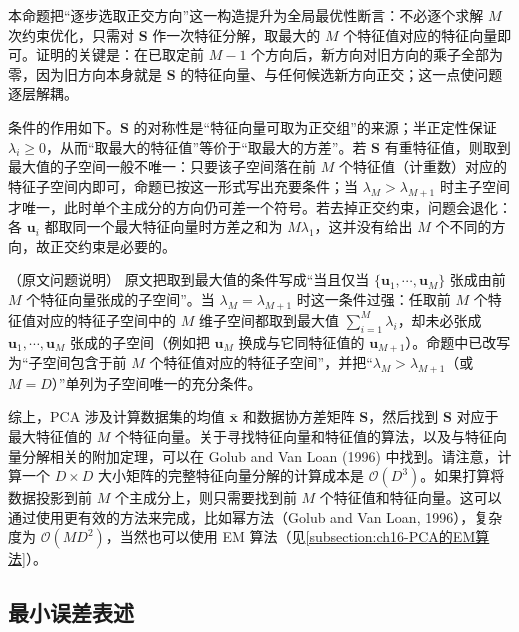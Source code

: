 \documentclass[../../main.tex]{subfiles}
\begin{document}
\begin{remark}
本命题把“逐步选取正交方向”这一构造提升为全局最优性断言：不必逐个求解 $M$ 次约束优化，只需对 $\bm{S}$ 作一次特征分解，取最大的 $M$ 个特征值对应的特征向量即可。证明的关键是：在已取定前 $M-1$ 个方向后，新方向对旧方向的乘子全部为零，因为旧方向本身就是 $\bm{S}$ 的特征向量、与任何候选新方向正交；这一点使问题逐层解耦。

条件的作用如下。$\bm{S}$ 的对称性是“特征向量可取为正交组”的来源；半正定性保证 $\lambda_i\geqslant0$，从而“取最大的特征值”等价于“取最大的方差”。若 $\bm{S}$ 有重特征值，则取到最大值的子空间一般不唯一：只要该子空间落在前 $M$ 个特征值（计重数）对应的特征子空间内即可，命题已按这一形式写出充要条件；当 $\lambda_M>\lambda_{M+1}$ 时主子空间才唯一，此时单个主成分的方向仍可差一个符号。若去掉正交约束，问题会退化：各 $\bm{u}_i$ 都取同一个最大特征向量时方差之和为 $M\lambda_1$，这并没有给出 $M$ 个不同的方向，故正交约束是必要的。
\end{remark}

\begin{remark}（原文问题说明）
原文把取到最大值的条件写成“当且仅当 $\{\bm{u}_1,\cdots,\bm{u}_M\}$ 张成由前 $M$ 个特征向量张成的子空间”。当 $\lambda_M=\lambda_{M+1}$ 时这一条件过强：任取前 $M$ 个特征值对应的特征子空间中的 $M$ 维子空间都取到最大值 $\sum_{i=1}^{M}\lambda_i$，却未必张成 $\bm{u}_1,\cdots,\bm{u}_M$ 张成的子空间（例如把 $\bm{u}_M$ 换成与它同特征值的 $\bm{u}_{M+1}$）。命题中已改写为“子空间包含于前 $M$ 个特征值对应的特征子空间”，并把“$\lambda_M>\lambda_{M+1}$（或 $M=D$）”单列为子空间唯一的充分条件。
\end{remark}

综上，PCA 涉及计算数据集的均值 $\bar{\bm{x}}$ 和数据协方差矩阵 $\bm{S}$，然后找到 $\bm{S}$ 对应于最大特征值的 $M$ 个特征向量。关于寻找特征向量和特征值的算法，以及与特征向量分解相关的附加定理，可以在 Golub and Van Loan (1996) 中找到。请注意，计算一个 $D\times D$ 大小矩阵的完整特征向量分解的计算成本是 $\mathcal{O}(D^3)$。如果打算将数据投影到前 $M$ 个主成分上，则只需要找到前 $M$ 个特征值和特征向量。这可以通过使用更有效的方法来完成，比如幂方法（Golub and Van Loan, 1996），复杂度为 $\mathcal{O}(MD^2)$，当然也可以使用 EM 算法（见\cref{subsection:ch16-PCA的EM算法}）。

\subsection{最小误差表述}\label{subsection:ch16-最小误差表述}
\end{document}
